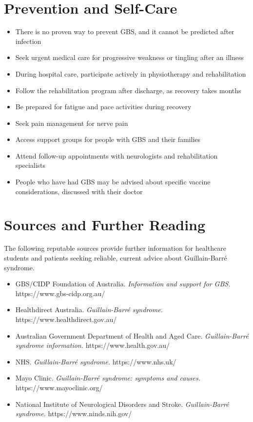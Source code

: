 \section*{Prevention and Self-Care}
\begin{itemize}
    \item There is no proven way to prevent GBS, and it cannot be predicted after infection
    \item Seek urgent medical care for progressive weakness or tingling after an illness
    \item During hospital care, participate actively in physiotherapy and rehabilitation
    \item Follow the rehabilitation program after discharge, as recovery takes months
    \item Be prepared for fatigue and pace activities during recovery
    \item Seek pain management for nerve pain
    \item Access support groups for people with GBS and their families
    \item Attend follow-up appointments with neurologists and rehabilitation specialists
    \item People who have had GBS may be advised about specific vaccine considerations, discussed with their doctor
\end{itemize}

\section*{Sources and Further Reading}
The following reputable sources provide further information for healthcare students and patients seeking reliable, current advice about Guillain-Barré syndrome.

\begin{itemize}
    \item GBS/CIDP Foundation of Australia. \textit{Information and support for GBS.} https://www.gbs-cidp.org.au/
    \item Healthdirect Australia. \textit{Guillain-Barré syndrome.} https://www.healthdirect.gov.au/
    \item Australian Government Department of Health and Aged Care. \textit{Guillain-Barré syndrome information.} https://www.health.gov.au/
    \item NHS. \textit{Guillain-Barré syndrome.} https://www.nhs.uk/
    \item Mayo Clinic. \textit{Guillain-Barré syndrome: symptoms and causes.} https://www.mayoclinic.org/
    \item National Institute of Neurological Disorders and Stroke. \textit{Guillain-Barré syndrome.} https://www.ninds.nih.gov/
\end{itemize}
